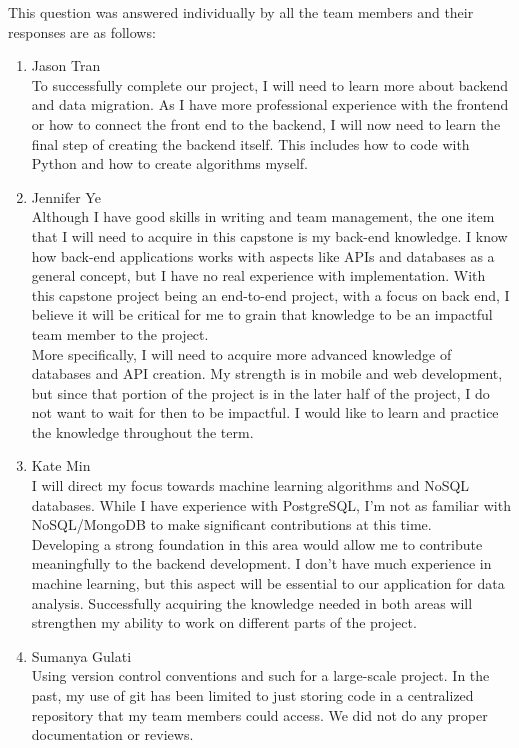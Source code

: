 \documentclass[12pt]{article}
\begin{document}
\begin{enumerate}
  This question was answered individually by all the team members and their responses are as follows:\\
  \begin{enumerate}
    \item Jason Tran\\
    To successfully complete our project, I will need to learn more about backend and data migration. As I have more professional experience with the frontend or
    how to connect the front end to the backend, I will now need to learn the final step of creating the backend itself. This includes how to code with Python and
    how to create algorithms myself.
    \newline
    \item Jennifer Ye\\
    Although I have good skills in writing and team management, the one item that I will need to acquire in this capstone is my back-end knowledge. I know how back-end
    applications works with aspects like APIs and databases as a general concept, but I have no real experience with implementation. With this capstone project being an
    end-to-end project, with a focus on back end, I believe it will be critical for me to grain that knowledge to be an impactful team member to the project.\\
    
    More specifically, I will need to acquire more advanced knowledge of databases and API creation. My strength is in mobile and web development, but since that 
    portion of the project is in the later half of the project, I do not want to wait for then to be impactful. I would like to learn and practice the knowledge throughout the term.
    \newline
    \item Kate Min\\
    I will direct my focus towards machine learning algorithms and NoSQL databases. While I have experience with PostgreSQL, I'm not as familiar with NoSQL/MongoDB to make
    significant contributions at this time.\\
    
    Developing a strong foundation in this area would allow me to contribute meaningfully to the backend development. I don't have much experience in machine learning, but this
    aspect will be essential to our application for data analysis. Successfully acquiring the knowledge needed in both areas will strengthen my ability to work on different parts of the project.
    \newline
    \item Sumanya Gulati\\
    Using version control conventions and such for a large-scale project. In the past, my use of git has been limited to just storing code in a centralized repository that my team
    members could access. We did not do any proper documentation or reviews.\\
    

\end{enumerate}
\end{enumerate}
\end{document}
